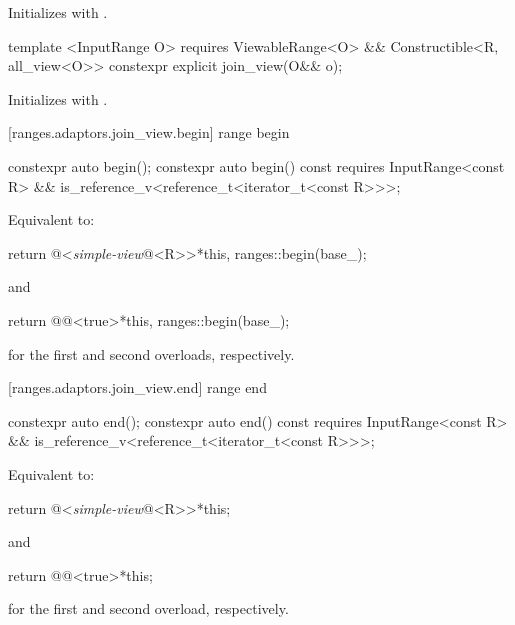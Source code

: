 \begin{itemdescr}
\pnum
\effects Initializes  with .
\end{itemdescr}

%
\begin{itemdecl}
template <InputRange O>
  requires ViewableRange<O> && Constructible<R, all_view<O>>
constexpr explicit join_view(O&& o);
\end{itemdecl}

\begin{itemdescr}
\pnum
\effects Initializes  with .
\end{itemdescr}

[ranges.adaptors.join_view.begin]{ range begin}

%
\begin{itemdecl}
constexpr auto begin();
constexpr auto begin() const requires InputRange<const R> &&
  is_reference_v<reference_t<iterator_t<const R>>>;
\end{itemdecl}

\begin{itemdescr}
\pnum
\effects Equivalent to:
\begin{codeblock}
return @<\textit{simple-view}@<R>>{*this, ranges::begin(base_)};
\end{codeblock}
and
\begin{codeblock}
return @@<true>{*this, ranges::begin(base_)};
\end{codeblock}
for the first and second overloads, respectively.
\end{itemdescr}

[ranges.adaptors.join_view.end]{ range end}

%
\begin{itemdecl}
constexpr auto end();
constexpr auto end() const requires InputRange<const R> &&
  is_reference_v<reference_t<iterator_t<const R>>>;
\end{itemdecl}

\begin{itemdescr}
\pnum
\effects Equivalent to:
\begin{codeblock}
return @<\textit{simple-view}@<R>>{*this};
\end{codeblock}
  and
\begin{codeblock}
return @@<true>{*this};
\end{codeblock}
for the first and second overload, respectively.
\end{itemdescr}

